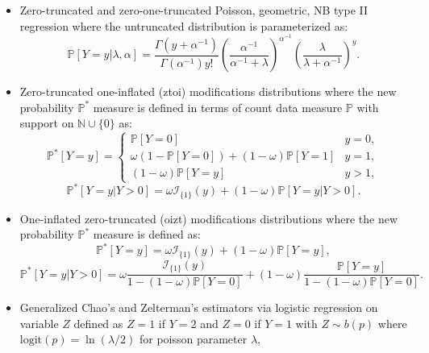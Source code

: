 \documentclass[
]{jss}
\newcommand{\1}{\mathcal{I}} \newcommand{\bx}{\boldsymbol{x}}
\begin{document}
\begin{itemize}
    \item Zero-truncated and zero-one-truncated Poisson, geometric, NB type II regression where the untruncated distribution is parameterized as:
    \begin{equation*}
        \mathbb{P}[Y=y|\lambda,\alpha] = \frac{\Gamma\left(y+\alpha^{-1}\right)}{\Gamma\left(\alpha^{-1}\right)y!}
        \left(\frac{\alpha^{-1}}{\alpha^{-1}+\lambda}\right)^{\alpha^{-1}}
        \left(\frac{\lambda}{\lambda + \alpha^{-1}}\right)^{y}.
    \end{equation*}
    \item Zero-truncated one-inflated (ztoi) modifications distributions where the new probability $\mathbb{P}^{\ast}$ measure is defined in terms of count data measure $\mathbb{P}$ with support on $\mathbb{N}\cup\{0\}$ as:
    \begin{equation*}
    \mathbb{P}^{\ast}[Y=y]=
    \begin{cases}
    \mathbb{P}[Y=0] & y=0, \\
    \omega\left(1-\mathbb{P}[Y=0]\right)+(1-\omega)\mathbb{P}[Y=1] & y=1, \\
    (1-\omega)\mathbb{P}[Y=y] & y>1,
    \end{cases}
    \end{equation*}
    \begin{equation*}
        \mathbb{P}^{\ast}[Y=y|Y>0]=\omega\mathcal{I}_{\{1\}}(y)+(1-\omega)\mathbb{P}[Y=y|Y>0].
    \end{equation*}
    \item One-inflated zero-truncated (oizt) modifications distributions where the new probability $\mathbb{P}^{\ast}$ measure is defined as:
    \begin{equation*}
        \mathbb{P}^{\ast}[Y=y] = \omega \mathcal{I}_{\{1\}}(y)+(1-\omega)\mathbb{P}[Y=y],
    \end{equation*}
    \begin{equation*}
        \mathbb{P}^{\ast}[Y=y|Y>0] = 
        \omega\frac{\mathcal{I}_{\{1\}}(y)}{1-(1-\omega)\mathbb{P}[Y=0]}+
        (1-\omega)\frac{\mathbb{P}[Y=y]}{1-(1-\omega)\mathbb{P}[Y=0]}.
    \end{equation*}
    \item Generalized Chao's and Zelterman's estimators via logistic regression on variable $Z$ defined as $Z=1$ if $Y=2$ and $Z=0$ if $Y=1$ with $Z\sim b(p)$ where $\text{logit}(p)=\ln(\lambda/2)$ for poisson parameter $\lambda$,
    \begin{align}

\end{align}
\end{itemize}
\end{document}
